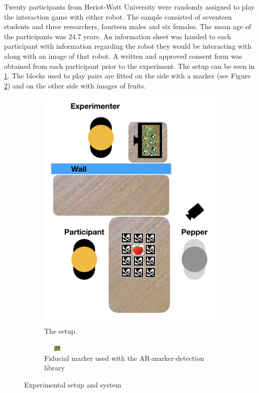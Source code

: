 \documentclass[letterpaper]{article} %
\begin{document}
Twenty participants from Heriot-Watt University were randomly assigned to play the interaction game with either robot. The sample consisted of seventeen students and three researchers, fourteen males and six females. The mean age of the participants was 24.7 years. An information sheet was handed to each participant with information regarding the robot they would be interacting with along with an image of that robot. A written and approved consent form was obtained from each participant prior to the experiment.
The setup can be seen in \ref{pic2}. The blocks used to play pairs are fitted on the side with a marker (see Figure \ref{pic3}) and on the other side with images of fruits.
\begin{figure}
\centering
\begin{subfigure}[b]{0.27\textwidth}
\includegraphics[width=\textwidth]{Picture4.png}
\caption{The setup.}
\label{pic2}
\end{subfigure}
\vspace{-3.36mm}
\begin{subfigure}[b]{0.12\textwidth}
\includegraphics[width=0.1512\textwidth,height=0.1in ]{Picture3.png}
\caption{Fiducial marker used with the AR-marker-detection library}
\label{pic3}
\end{subfigure}
\caption{Experimental setup and system}\label{fig:animals}
\end{figure}
\end{document}
